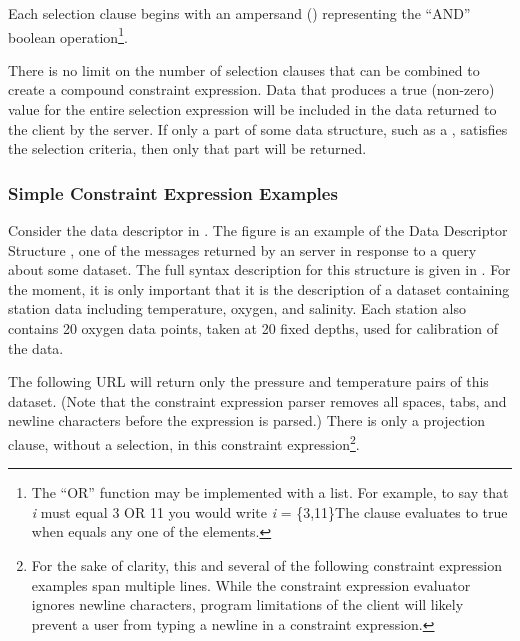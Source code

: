 Each selection clause begins with an ampersand (\lit{\&}) representing
the ``AND'' boolean operation\footnote{The ``OR'' function may be
  implemented with a list.  For example, to say that {\em i} must
  equal 3 OR 11 you would write {\em i} = \{3,11\}The clause evaluates
  to true when  equals any one of the elements.}.


There is no limit on the number of selection clauses that can be
combined to create a compound constraint expression.  Data that
produces a true (non-zero) value for the entire selection expression
will be included in the data returned to the client by the server. If
only a part of some data structure, such as a ,
satisfies the selection criteria, then only that part will be
returned.


\subsubsection{Simple Constraint Expression Examples}

Consider the data descriptor in .  The
figure is an example of the Data Descriptor Structure  , one of the messages returned by an \opendap server in response to a query about some dataset. The full syntax
description for this structure is given in . For
the moment, it is only important that it is the description of a dataset
containing station data including temperature, oxygen, and salinity. Each
station also contains 20 oxygen data points, taken at 20 fixed depths, used
for calibration of the data.

The following URL will return only the pressure and temperature pairs
of this dataset. (Note that the constraint expression parser removes
all spaces, tabs, and newline characters before the expression is
parsed.) There is only a projection clause, without a selection, in
this constraint expression\footnote{For the sake of clarity, this and
  several of the following constraint expression examples span
  multiple lines.  While the constraint expression evaluator ignores
  newline characters, program limitations of the \opendap client will
  likely prevent a user from typing a newline in a constraint
  expression.}.


